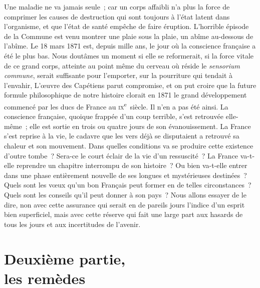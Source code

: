 \documentclass[french,twoside]{book} %
\begin{document}
Une maladie ne va jamais seule ; car un corps affaibli n’a plus la force de comprimer les causes de destruction qui sont toujours à l’état latent dans l’organisme, et que l’état de santé empêche de faire éruption. L’horrible épisode de la Commune est venu montrer une plaie sous la plaie, un abîme au-dessous de l’abîme. Le 18 mars 1871 est, depuis mille ans, le jour où la conscience française a été le plus bas. Nous doutâmes un moment si elle se reformerait, si la force vitale de ce grand corps, atteinte au point même du cerveau où réside le {\itshape sensorium commune}, serait suffisante pour l’emporter, sur la pourriture qui tendait à l’envahir, L’œuvre des Capétiens parut compromise, et on put croire que la future formule philosophique de notre histoire clorait en 1871 le grand développement commencé par les ducs de France au \textsc{ix}\textsuperscript{e} siècle. Il n’en a pas été ainsi. La conscience française, quoique frappée d’un coup terrible, s’est retrouvée elle-même ; elle est sortie en trois ou quatre jours de son évanouissement. La France s’est reprise à la vie, le cadavre que les vers déjà se disputaient a retrouvé sa chaleur et son mouvement. Dans quelles conditions va se produire cette existence d’outre tombe ? Sera-ce le court éclair de la vie d’un ressuscité ? La France va-t-elle reprendre un chapitre interrompu de son histoire ? Ou bien va-t-elle entrer dans une phase entièrement nouvelle de ses longues et mystérieuses destinées ? Quels sont les vœux qu’un bon Français peut former en de telles circonstances ? Quels sont les conseils qu’il peut donner à son pays ? Nous allons essayer de le dire, non avec cette assurance qui serait en de pareils jours l’indice d’un esprit bien superficiel, mais avec cette réserve qui fait une large part aux hasards de tous les jours et aux incertitudes de l’avenir.
\section[{Deuxième partie, les remèdes}]{Deuxième partie,\\
 les remèdes}\renewcommand{\leftmark}{Deuxième partie,\\
 les remèdes}
\end{document}
